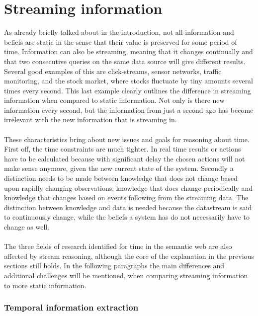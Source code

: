 \documentclass{llncs}
\begin{document}
\section{Streaming information}
\label{sec:streaming}

As already briefly talked about in the introduction, not all information and beliefs are static in the sense that their value is preserved for some period of time. Information can also be streaming, meaning that it changes continually and that two consecutive queries on the same data source will give different results. Several good examples of this are click-streams, sensor networks, traffic monitoring, and the stock market, where stocks fluctuate by tiny amounts several times every second.\cite{Valle2009a} This last example clearly outlines the difference in streaming information when compared to static information. Not only is there new information every second, but the information from just a second ago has become irrelevant with the new information that is streaming in.\\
\\
These characteristics bring about new issues and goals for reasoning about time. First off, the time constraints are much tighter. In real time results or actions have to be calculated because with significant delay the chosen actions will not make sense anymore, given the new current state of the system. Secondly a distinction needs to be made between knowledge that does not change based upon rapidly changing observations, knowledge that does change periodically and knowledge that changes based on events following from the streaming data.\cite{Valle2009a} The distinction between knowledge and data is needed because the datastream is said to continuously change, while the beliefs a system has do not necessarily have to change as well.\\
\\
The three fields of research identified for time in the semantic web are also affected by stream reasoning, although the core of the explanation in the previous sections still holds. In the following paragraphs the main differences and additional challenges will be mentioned, when comparing streaming information to more static information.

\subsubsection{Temporal information extraction}
\end{document}
